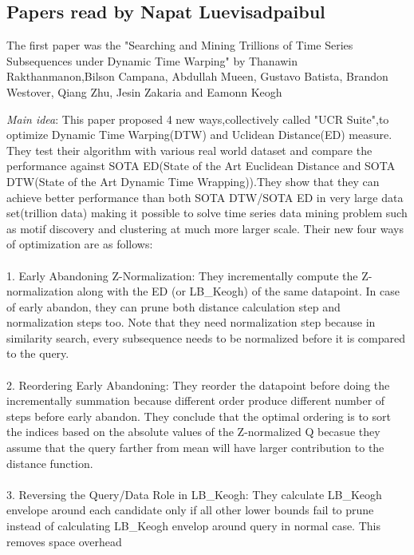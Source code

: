 \subsection{Papers read by Napat Luevisadpaibul }
The first paper was the "Searching and Mining Trillions of Time Series Subsequences under Dynamic Time Warping" by Thanawin Rakthanmanon,Bilson Campana, Abdullah Mueen, Gustavo Batista, Brandon Westover, Qiang Zhu, Jesin Zakaria and Eamonn Keogh

\begin{itemize*}
\item {\em Main idea}: This paper proposed 4 new ways,collectively called "UCR Suite",to optimize Dynamic Time Warping(DTW) and Uclidean Distance(ED) measure. They test their algorithm with various real world dataset and compare the performance against SOTA ED(State of the Art Euclidean Distance and SOTA DTW(State of the Art Dynamic Time Wrapping)).They show that they can achieve better performance than both SOTA DTW/SOTA ED in very large data set(trillion data) making it possible to solve time series data mining problem such as motif discovery and clustering at much more larger scale. Their new four ways of optimization are as follows:\\\\
1. Early Abandoning Z-Normalization:  They incrementally compute the Z-normalization along with the ED (or LB\_Keogh) of the same datapoint. In case of early abandon, they can prune both distance calculation step and normalization steps too. Note that they need normalization
step because in similarity search, every subsequence needs to be normalized before it is compared to the query.\\\\
2. Reordering Early Abandoning: They reorder the datapoint before doing the incrementally summation because different order produce different number of steps before early abandon. They conclude that the optimal ordering is to sort the indices based on the absolute values of the Z-normalized Q becasue they assume that the query farther from mean will have larger contribution to the distance function.
\\\\
3. Reversing the Query/Data Role in LB\_Keogh: They calculate LB\_Keogh  envelope around each candidate only if all other lower bounds fail to prune instead of calculating LB\_Keogh envelop around query in normal case. This removes space overhead\\\\

\end{itemize*}
